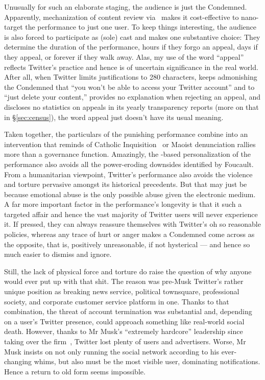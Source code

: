 Unusually for such an elaborate staging, the audience is just the Condemned.
Apparently, mechanization of content review via \AI\ makes it cost-effective to
nano-target the performance to just one user. To keep things interesting, the
audience is also forced to participate as (sole) cast and makes one substantive
choice: They determine the duration of the performance, hours if they forgo an
appeal, days if they appeal, or forever if they walk away. Alas, my use of the
word ``appeal'' reflects Twitter's practice and hence is of uncertain
significance in the real world. After all, when Twitter limits justifications to
280 characters, keeps admonishing the Condemned that ``you won't be able to
access your Twitter account'' and to ``just delete your content,'' provides no
explanation when rejecting an appeal, and discloses no statistics on appeals in
its yearly transparency reports (more on that in \S\ref{sec:census}), the word
appeal just doesn't have its usual meaning.

Taken together, the particulars of the punishing performance combine into an
intervention that reminds of Catholic
Inquisition~\cite{Lea1906a,Lea1906b,Lea1906c,Lea1906d} or Maoist denunciation
rallies~\cite{Yang2021} more than a governance function. Amazingly, the
\AI-based personalization of the performance also avoids all the power-eroding
downsides identified by Foucault. From a humanitarian viewpoint, Twitter's
performance also avoids the violence and torture pervasive amongst its
historical precedents. But that may just be because emotional abuse is the only
possible abuse given the electronic medium. A far more important factor in the
performance's longevity is that it such a targeted affair and hence the vast
majority of Twitter users will never experience it. If pressed, they can always
reassure themselves with Twitter's oh so reasonable policies, whereas any trace
of hurt or anger makes a Condemned come across as the opposite, that is,
positively unreasonable, if not hysterical --- and hence so much easier to
dismiss and ignore.

Still, the lack of physical force and torture do raise the question of why
anyone would ever put up with that shit. The reason was pre-Musk Twitter's
rather unique position as breaking news service, political townsquare,
professional society, and corporate customer service platform in one. Thanks to
that combination, the threat of account termination was substantial and,
depending on a user's Twitter presence, could approach something like real-world
social death. However, thanks to Mr Musk's ``extremely hardcore'' leadership
since taking over the firm~\cite{SchifferNewtonea2023}, Twitter lost plenty of
users and advertisers. Worse, Mr Musk insists on not only running the social
network according to his ever-changing whims, but also must be the most visible
user, dominating notifications. Hence a return to old form seems impossible.


